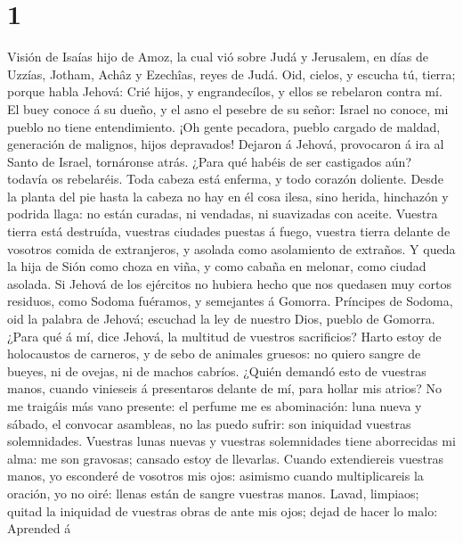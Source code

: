 \hypertarget{section}{%
\section{1}\label{section}}

 Visión de Isaías hijo de Amoz, la cual vió sobre Judá y
Jerusalem, en días de Uzzías, Jotham, Achâz y Ezechîas, reyes de Judá.
 Oid, cielos, y escucha tú, tierra; porque habla Jehová:
Crié hijos, y engrandecílos, y ellos se rebelaron contra mí.
 El buey conoce á su dueño, y el asno el pesebre de su
señor: Israel no conoce, mi pueblo no tiene entendimiento.
 ¡Oh gente pecadora, pueblo cargado de maldad, generación
de malignos, hijos depravados! Dejaron á Jehová, provocaron á ira al
Santo de Israel, tornáronse atrás.  ¿Para qué habéis de
ser castigados aún? todavía os rebelaréis. Toda cabeza está enferma, y
todo corazón doliente.  Desde la planta del pie hasta la
cabeza no hay en él cosa ilesa, sino herida, hinchazón y podrida llaga:
no están curadas, ni vendadas, ni suavizadas con aceite. 
Vuestra tierra está destruída, vuestras ciudades puestas á fuego,
vuestra tierra delante de vosotros comida de extranjeros, y asolada como
asolamiento de extraños.  Y queda la hija de Sión como
choza en viña, y como cabaña en melonar, como ciudad asolada.
 Si Jehová de los ejércitos no hubiera hecho que nos
quedasen muy cortos residuos, como Sodoma fuéramos, y semejantes á
Gomorra.  Príncipes de Sodoma, oid la palabra de Jehová;
escuchad la ley de nuestro Dios, pueblo de Gomorra. 
¿Para qué á mí, dice Jehová, la multitud de vuestros sacrificios? Harto
estoy de holocaustos de carneros, y de sebo de animales gruesos: no
quiero sangre de bueyes, ni de ovejas, ni de machos cabríos.
 ¿Quién demandó esto de vuestras manos, cuando vinieseis
á presentaros delante de mí, para hollar mis atrios?  No
me traigáis más vano presente: el perfume me es abominación: luna nueva
y sábado, el convocar asambleas, no las puedo sufrir: son iniquidad
vuestras solemnidades.  Vuestras lunas nuevas y vuestras
solemnidades tiene aborrecidas mi alma: me son gravosas; cansado estoy
de llevarlas.  Cuando extendiereis vuestras manos, yo
esconderé de vosotros mis ojos: asimismo cuando multiplicareis la
oración, yo no oiré: llenas están de sangre vuestras manos.
 Lavad, limpiaos; quitad la iniquidad de vuestras obras
de ante mis ojos; dejad de hacer lo malo:  Aprended á
